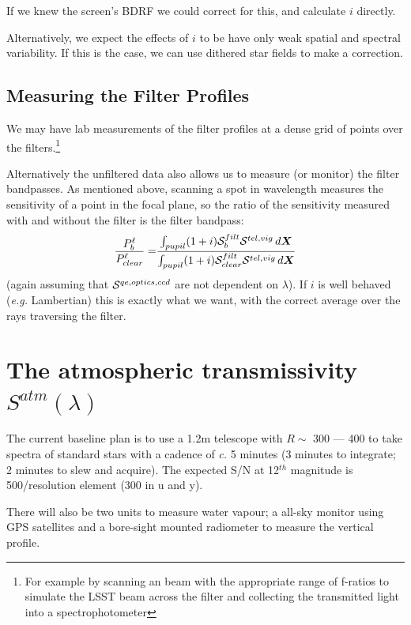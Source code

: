 \documentclass[12pt]{article}
\renewcommand{\c}{\textit{c.}\xspace}
\newcommand{\eg}{\textit{e.g.}\xspace}
\newcommand{\Xb}{{\boldsymbol X}}
\newcommand{\qe}{{\cal S}}
\begin{document}
If we knew the screen's BDRF we could correct for this, and calculate $i$ directly.

Alternatively, we expect the effects of $i$ to be have only weak spatial and spectral variability.  If this
is the case, we can use dithered star fields to make a correction.

\subsection{Measuring the Filter Profiles}
\label{secFilterProfiles}

We may have lab measurements of the filter profiles at a dense grid of points over the filters.\footnote{
  For example by scanning an beam with the appropriate range of f-ratios to simulate the LSST beam
  across the filter and collecting the transmitted light into a spectrophotometer}

Alternatively the unfiltered data also allows us to measure (or monitor) the filter bandpasses.  As mentioned
above, scanning a spot in wavelength measures the sensitivity of a point in the focal plane, so the ratio of
the sensitivity measured with and without the filter is the filter bandpass:
\begin{align*}
  \frac{P_b^\ell}{P_{clear}^\ell} =& \frac{\int_{pupil} (1 + i) \qe_b^{filt} \qe^{tel, vig}\, d\Xb}
                                          {\int_{pupil} (1 + i) \qe_{clear}^{filt} \qe^{tel, vig}\, d\Xb}\\
\end{align*}
(again assuming that $\qe^{qe, optics, ccd}$ are not dependent on $\lambda$).  If $i$ is well behaved (\eg
Lambertian) this is exactly what we want, with the correct average over the rays traversing the filter.

\section{The atmospheric transmissivity \texorpdfstring{$S^{atm}(\lambda)$}{Satm}}

The current baseline plan is to use a 1.2m telescope with $R \sim $ 300 --- 400 to
take spectra of standard stars with a cadence of \c 5 minutes (3 minutes
to integrate;  2 minutes to slew and acquire).  The expected
S/N at 12$^{th}$ magnitude is 500/resolution element (300 in u and y).

There will also be two units to measure water vapour;  a all-sky monitor using GPS satellites
and a bore-sight mounted radiometer to measure the vertical profile.
\end{document}
